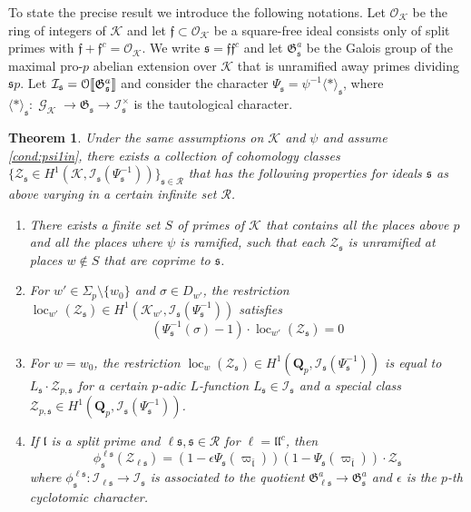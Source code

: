 \documentclass[leqno]{amsart}
\newtheorem{thm}{Theorem}[section]
\theoremstyle{definition}
\theoremstyle{remark}
\newcommand{\oo}{\mathcal{O}}
\newcommand{\eo}{\EuScript{O}}
\newcommand{\Qp}{\mathbf{Q}_p}
\DeclareMathOperator{\Gal}{\mathcal{G}}
\newcommand{\ff}{\mathfrak{f}}
\newcommand{\fl}{\mathfrak{l}}
\newcommand{\fs}{\mathfrak{s}}
\newcommand{\K}{{\mathcal{K}}} %
\newcommand{\fG}{\mathfrak{G}}
\newcommand{\I}{\mathcal{I}} %
\DeclareMathOperator{\loc}{loc}
\begin{document}
To state the precise result 
we introduce the following notations.
Let $\oo_\K$ be the ring of integers of $\K$
and let $\ff\subset \oo_\K$ be a square-free ideal
consists only of split primes
with $\ff+\ff^c=\oo_\K$. 
We write $\fs=\ff\ff^c$
and let $\fG_\fs^a$ be the Galois group of the maximal 
pro-$p$ abelian extension over $\K$ that is unramified 
away primes dividing $\fs p$.
Let $\I_\fs=\eo\llbracket \fG_\fs^a\rrbracket$
and consider the character $\Psi_\fs=\psi^{-1}\langle*\rangle_\fs$,
where $\langle*\rangle_\fs\colon \Gal_\K\to \fG_\fs\to \I_\fs^\times$
is the tautological character.

\begin{thm}

Under the same assumptions on $\K$ and $\psi$
and assume \ref{cond:psi1in},
there exists a collection of cohomology classes
$\{\mathcal{Z}_\fs\in H^1(\K, \I_\fs(\Psi_\fs^{-1}))\}_{\fs\in\mathcal{R}}$
that has the following properties
for ideals $\fs$ as above varying 
in a certain infinite set $\mathcal{R}$.
\begin{enumerate}
    \item There exists a finite set $S$ of primes of $\K$
    that contains all the places above $p$ and all the 
    places where $\psi$ is ramified, such that each
    $\mathcal{Z}_{\fs}$ is unramified at places $w\notin S$
    that are coprime to $\fs$.
    \item For $w'\in \Sigma_p\setminus\{w_0\}$
    and $\sigma\in D_{w'}$, the restriction
    $\loc_{w'}(\mathcal{Z}_\fs)\in H^1(\K_{w'}, \I_\fs(\Psi_\fs^{-1}))$
    satisfies 
    \[
        (\Psi_{\fs}^{-1}(\sigma)-1)\cdot \loc_{w'}(\mathcal{Z}_\fs)=0
    \]
    \item For $w=w_0$, the restriction 
    $\loc_{w}(\mathcal{Z}_\fs)\in H^1(\Qp, \I_\fs(\Psi_\fs^{-1}))$
    is equal to $L_\fs\cdot \mathcal{Z}_{p,\fs}$ for
    a certain $p$-adic $L$-function $L_\fs\in \I_\fs$ 
    and a special class
    $\mathcal{Z}_{p,\fs}\in H^1(\Qp, \I_\fs(\Psi_\fs^{-1}))$.
    \item If $\fl$ is a split prime 
    and $\ell\fs,\fs\in \mathcal{R}$ for $\ell=\fl\fl^c$, then
    \[
        \phi^{\ell\fs}_\fs(\mathcal{Z}_{\ell\fs})=
        (1-\epsilon\Psi_{\fs}(\varpi_{\bar{\fl}}))
        (1-\Psi_\fs(\varpi_{\bar{\fl}}))\cdot 
        \mathcal{Z}_{\fs}
    \]
    where $\phi^{\ell\fs}_\fs\colon \I_{\ell\fs}\to \I_\fs$
    is associated to the quotient $\fG_{\ell\fs}^a\to \fG_\fs^a$
    and $\epsilon$ is the $p$-th cyclotomic character.
\end{enumerate}
\end{thm}
\end{document}
